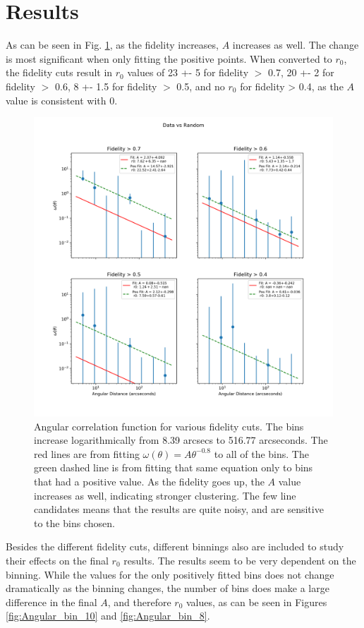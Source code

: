 \section{Results}

As can be seen in Fig. \ref{fig:Angular_correlation}, as the fidelity increases, $A$ increases as well. The change is most significant when only fitting the positive points.  When converted to $r_0$, the fidelity cuts result in $r_0$ values of 23 +- 5 for fidelity $>$ 0.7, 20 +- 2 for fidelity $>$ 0.6, 8 +- 1.5 for fidelity $>$ 0.5, and no $r_0$ for fidelity > 0.4, as the $A$ value is consistent with 0. 

\begin{figure}[tbp]
\centering \includegraphics[width=120mm]{Log_4Panel_Data_Vs_Random_bin8_NFalse_Num10000.png}
\caption{Angular correlation function for various fidelity cuts. The bins increase logarithmically from 8.39 arcsecs to 516.77 arcseconds. The red lines are from fitting $\omega(\theta) = A\theta^{-0.8} $ to all of the bins. The green dashed line is from fitting that same equation only to bins that had a positive value. As the fidelity goes up, the $A$ value increases as well, indicating stronger clustering. The few line candidates means that the results are quite noisy, and are sensitive to the bins chosen.}
\label{fig:Angular_correlation}
\end{figure}

Besides the different fidelity cuts, different binnings also are included to study their effects on the final $r_0$ results. The results seem to be very dependent on the binning. While the values for the only positively fitted bins does not change dramatically as the binning changes, the number of bins does make a large difference in the final $A$, and therefore $r_0$ values, as can be seen in Figures \ref{fig:Angular_bin_10} and \ref{fig:Angular_bin_8}.

